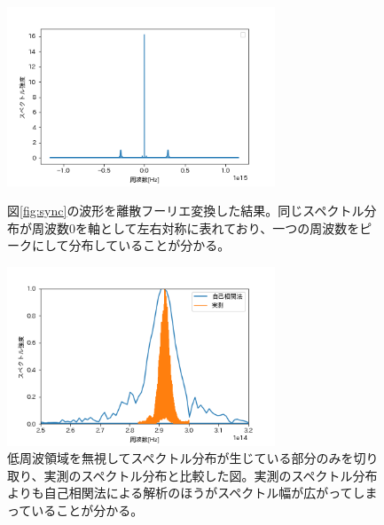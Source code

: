 \documentclass[titlepage]{jsarticle}
\begin{document}
\begin{figure}[htbp]
 \begin{minipage}{0.5\hsize}
  \begin{center}
   \includegraphics[width=80mm]{spectrum_all.png}
  \end{center}
  \caption{図\ref{fig:sync}の波形を離散フーリエ変換した結果。同じスペクトル分布が周波数0を軸として左右対称に表れており、一つの周波数をピークにして分布していることが分かる。}
  \label{fig:PD_spectrum}
 \end{minipage}
 \begin{minipage}{0.5\hsize}
  \begin{center}
   \includegraphics[width=80mm]{spectrum.png}
  \end{center}
  \caption{低周波領域を無視してスペクトル分布が生じている部分のみを切り取り、実測のスペクトル分布と比較した図。実測のスペクトル分布よりも自己相関法による解析のほうがスペクトル幅が広がってしまっていることが分かる。}
  \label{fig:spectrum_relation}
 \end{minipage}
\end{figure}
\end{document}
